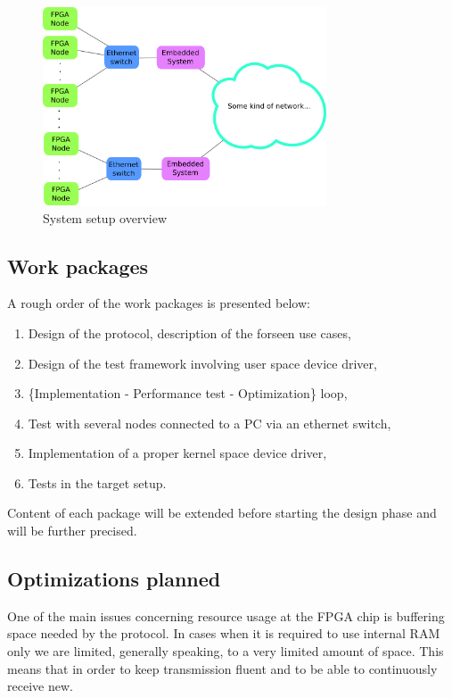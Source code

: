 \documentclass[12pt,a4paper]{article}
\begin{document}
                \begin{figure}[h!]
                \begin{center}
                \includegraphics[width=0.75\textwidth]{setup.png}
                \caption{System setup overview}
                \end{center}
                \end{figure}
\subsection{Work packages}
A rough order of the work packages is presented below:
\begin{enumerate}
\item Design of the protocol, description of the forseen use cases,
\item Design of the test framework involving user space device driver,
\item \{Implementation - Performance test - Optimization\} loop,
\item Test with several nodes connected to a PC via an ethernet switch,
\item Implementation of a proper kernel space device driver,
\item Tests in the target setup.
\end{enumerate}
Content of each package will be extended before starting the design phase and will be further precised. 

\subsection{Optimizations planned}
One of the main issues concerning resource usage at the FPGA chip is buffering space needed by the protocol. In cases when it is required to use internal RAM only we are limited, generally speaking, to a very limited amount of space. This means that in order to keep transmission fluent and to be able to continuously receive new. 
\end{document}
